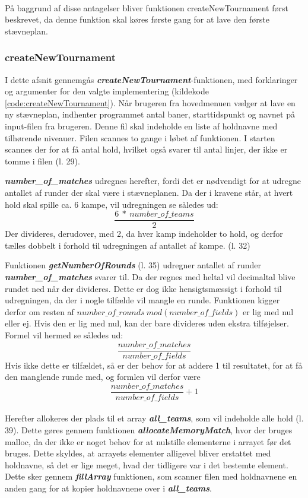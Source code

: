 \\
På baggrund af disse antagelser bliver funktionen createNewTournament først beskrevet, da denne funktion skal køres første gang for at lave den første stævneplan.

\subsubsection{createNewTournament}
I dette afsnit gennemgås \textbf{\textit{createNewTournament}}-funktionen, med forklaringer og argumenter for den valgte implementering (kildekode \ref{code:createNewTournament}). 
Når brugeren fra hovedmenuen vælger at lave en ny stævneplan, indhenter programmet antal baner, starttidspunkt og navnet på input-filen fra brugeren. Denne fil skal indeholde en liste af holdnavne med tilhørende niveauer. Filen scannes to gange i løbet af funktionen. I starten scannes der for at få antal hold, hvilket også svarer til antal linjer, der ikke er tomme i filen (l. 29).
\par
\textbf{\textit{number\_of\_matches}} udregnes herefter, fordi det er nødvendigt for at udregne antallet af runder der skal være i stævneplanen. Da der i kravene står, at hvert hold skal spille ca. 6 kampe, vil udregningen se således ud:
\[\frac{6\ * \ number\_of\_teams}{2}\]
Der divideres, derudover, med 2, da hver kamp indeholder to hold, og derfor tælles dobbelt i forhold til udregningen af antallet af kampe. (l. 32)
\par
Funktionen \textbf{\textit{getNumberOfRounds}} (l. 35) udregner antallet af runder \textbf{\textit{number\_of\_matches}} svarer til. Da der regnes med heltal vil decimaltal blive rundet ned når der divideres. Dette er dog ikke hensigtsmæssigt i forhold til udregningen, da der i nogle tilfælde vil mangle en runde. Funktionen kigger derfor om resten af $number\_of\_rounds \ mod(number\_of\_fields)$ er lig med nul eller ej. Hvis den er lig med nul, kan der bare divideres uden ekstra tilføjelser. Formel vil hermed se således ud:
\[\frac{number\_of\_matches}{number\_of\_fields}\]
Hvis ikke dette er tilfældet, så er der behov for at addere 1 til resultatet, for at få den manglende runde med, og formlen vil derfor være 
\[\frac{number\_of\_matches}{number\_of\_fields} + 1\]
\\
Herefter allokeres der plads til et array \textbf{\textit{all\_teams}}, som vil indeholde alle hold (l. 39). Dette gøres gennem funktionen \textbf{\textit{allocateMemoryMatch}}, hvor der bruges malloc, da der ikke er noget behov for at nulstille elementerne i arrayet før det bruges. Dette skyldes, at arrayets elementer alligevel bliver erstattet med holdnavne, så det er lige meget, hvad der tidligere var i det bestemte element. Dette sker gennem \textbf{\textit{fillArray}} funktionen, som scanner filen med holdnavnene en anden gang for at kopier holdnavnene over i \textbf{\textit{all\_teams}}.
